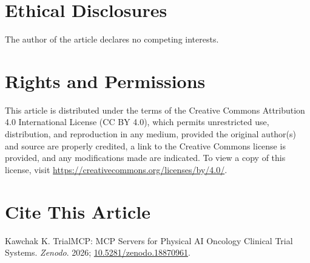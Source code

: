 \documentclass[10pt,letterpaper]{article}
\begin{document}
\section*{Ethical Disclosures}

The author of the article declares no competing interests.

\section*{Rights and Permissions}

This article is distributed under the terms of the Creative Commons Attribution 4.0 International License (CC BY 4.0), which permits unrestricted use, distribution, and reproduction in any medium, provided the original author(s) and source are properly credited, a link to the Creative Commons license is provided, and any modifications made are indicated. To view a copy of this license, visit \url{https://creativecommons.org/licenses/by/4.0/}.

\section*{Cite This Article}

Kawchak K. TrialMCP: MCP Servers for Physical AI Oncology Clinical Trial Systems. \textit{Zenodo}. 2026; \href{https://doi.org/10.5281/zenodo.18870961}{10.5281/zenodo.18870961}.
\end{document}
